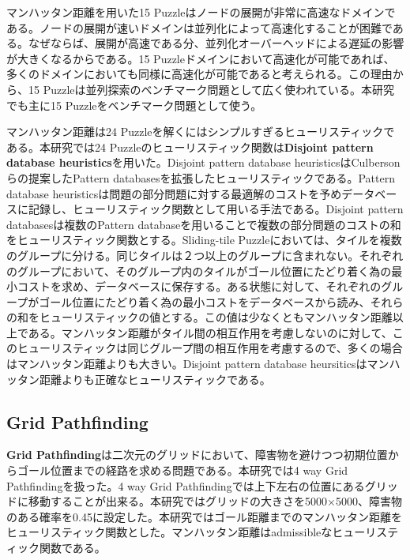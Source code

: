 \documentclass[uplatex]{jsarticle}
\begin{document}
マンハッタン距離を用いた15 Puzzleはノードの展開が非常に高速なドメインである。ノードの展開が速いドメインは並列化によって高速化することが困難である。なぜならば、展開が高速である分、並列化オーバーヘッドによる遅延の影響が大きくなるからである。15 Puzzleドメインにおいて高速化が可能であれば、多くのドメインにおいても同様に高速化が可能であると考えられる。この理由から、15 Puzzleは並列探索のベンチマーク問題として広く使われている。本研究でも主に15 Puzzleをベンチマーク問題として使う。

マンハッタン距離は24 Puzzleを解くにはシンプルすぎるヒューリスティックである。本研究では24 Puzzleのヒューリスティック関数は\textbf{Disjoint pattern database heuristics}を用いた\cite{Korf2002}。Disjoint pattern database heuristicsはCulbersonらの提案したPattern databasesを拡張したヒューリスティックである。Pattern database heuristicsは問題の部分問題に対する最適解のコストを予めデータベースに記録し、ヒューリスティック関数として用いる手法である\cite{Culberson1998pattern}。Disjoint pattern databasesは複数のPattern databaseを用いることで複数の部分問題のコストの和をヒューリスティック関数とする。Sliding-tile Puzzleにおいては、タイルを複数のグループに分ける。同じタイルは２つ以上のグループに含まれない。それぞれのグループにおいて、そのグループ内のタイルがゴール位置にたどり着く為の最小コストを求め、データベースに保存する。ある状態に対して、それぞれのグループがゴール位置にたどり着く為の最小コストをデータベースから読み、それらの和をヒューリスティックの値とする。この値は少なくともマンハッタン距離以上である。マンハッタン距離がタイル間の相互作用を考慮しないのに対して、このヒューリスティックは同じグループ間の相互作用を考慮するので、多くの場合はマンハッタン距離よりも大きい。Disjoint pattern database heursiticsはマンハッタン距離よりも正確なヒューリスティックである。


\subsection{Grid Pathfinding}

\textbf{Grid Pathfinding}は二次元のグリッドにおいて、障害物を避けつつ初期位置からゴール位置までの経路を求める問題である。本研究では4 way Grid Pathfindingを扱った。4 way Grid Pathfindingでは上下左右の位置にあるグリッドに移動することが出来る。本研究ではグリッドの大きさを5000$\times$5000、障害物のある確率を0.45に設定した。本研究ではゴール距離までのマンハッタン距離をヒューリスティック関数とした。マンハッタン距離はadmissibleなヒューリスティック関数である。
\end{document}

